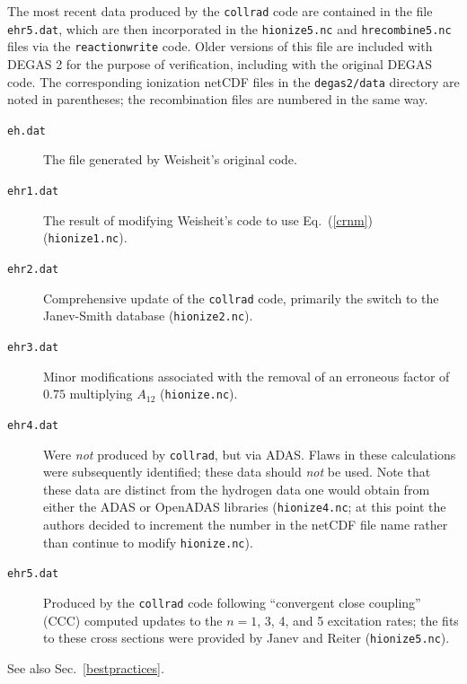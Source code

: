 \documentclass[12pt]{report}
\begin{document}
The most recent data produced by the {\tt collrad} code
are contained in the file {\tt ehr5.dat}, which are then
incorporated in the {\tt hionize5.nc} and {\tt hrecombine5.nc}
files via the {\tt reactionwrite} code.  Older versions of this
file are included with DEGAS 2 for the purpose of verification,
including with the original DEGAS code.  The corresponding 
ionization netCDF
files in the {\tt degas2/data} directory are noted in parentheses;
the recombination files are numbered in the same way.
\begin{description}
  \item[{\tt eh.dat}] The file generated by Weisheit's original code.
  \item[{\tt ehr1.dat}] The result of modifying Weisheit's code to use
Eq.~(\ref{crnm}) ({\tt hionize1.nc}).
  \item[{\tt ehr2.dat}] Comprehensive update of the {\tt collrad}
code, primarily the switch to the Janev-Smith database\cite{Jane93}
({\tt hionize2.nc}).
  \item[{\tt ehr3.dat}] Minor modifications associated with the removal
of an erroneous factor of $0.75$ multiplying $A_{12}$ ({\tt hionize.nc}).
  \item[{\tt ehr4.dat}] Were {\em not} produced by {\tt collrad}, but via
ADAS.  Flaws in these calculations were subsequently identified; these
data should {\em not} be used.  Note that these data are distinct from
the hydrogen data one would obtain from either the ADAS or OpenADAS
libraries ({\tt hionize4.nc}; at this point the authors decided to
increment the number in the netCDF file name rather than continue
to modify {\tt hionize.nc}).
  \item[{\tt ehr5.dat}] Produced by the {\tt collrad} code following
``convergent close coupling'' (CCC) computed updates to the $n = 1$, 3, 4,
and 5 excitation rates; the fits to these cross sections were provided
by Janev and Reiter ({\tt hionize5.nc}).
\end{description}
See also Sec.~\ref{bestpractices}.
\end{document}
